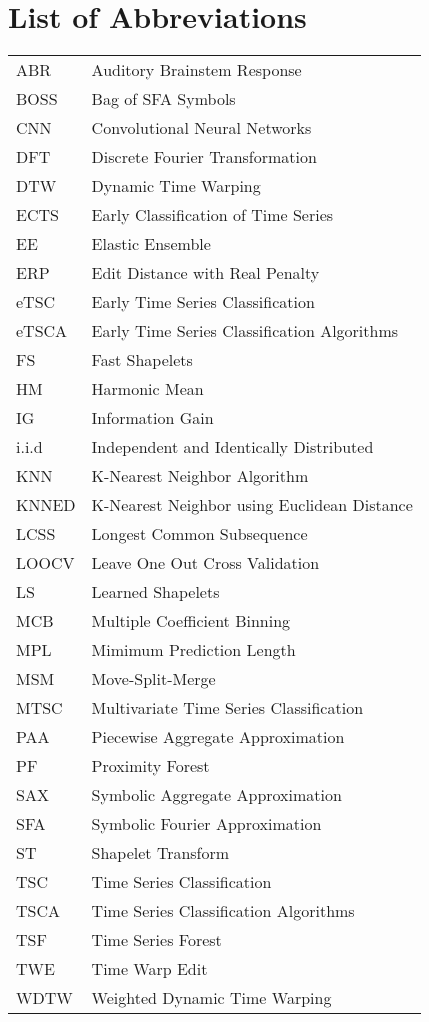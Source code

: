 \section*{List of Abbreviations}


\begin{table}[h!]
\begin{tabular}{ll}
ABR   & Auditory Brainstem Response\\
BOSS   & Bag of SFA Symbols\\
CNN   & Convolutional Neural Networks\\
DFT   & Discrete Fourier Transformation\\
DTW   & Dynamic Time Warping\\
ECTS   & Early Classification of Time Series\\
EE   & Elastic Ensemble\\
ERP   & Edit Distance with Real Penalty\\
eTSC   & Early Time Series Classification\\
eTSCA   & Early Time Series Classification Algorithms\\
FS   & Fast Shapelets\\
HM   & Harmonic Mean\\
IG   & Information Gain\\
i.i.d   & Independent and Identically Distributed\\
KNN   & K-Nearest Neighbor Algorithm\\
KNNED   & K-Nearest Neighbor using Euclidean Distance\\
LCSS   & Longest Common Subsequence\\
LOOCV   & Leave One Out Cross Validation\\
LS   & Learned Shapelets\\
MCB   & Multiple Coefficient Binning\\
MPL   & Mimimum Prediction Length\\
MSM   & Move-Split-Merge\\
MTSC   & Multivariate Time Series Classification\\
PAA   & Piecewise Aggregate Approximation\\
PF   & Proximity Forest\\
SAX   & Symbolic Aggregate Approximation\\
SFA   & Symbolic Fourier Approximation\\
ST   & Shapelet Transform\\
TSC   & Time Series Classification\\
TSCA   & Time Series Classification Algorithms\\
TSF   & Time Series Forest\\
TWE   & Time Warp Edit\\
WDTW   & Weighted Dynamic Time Warping
\end{tabular}
\end{table}

\null\newpage
